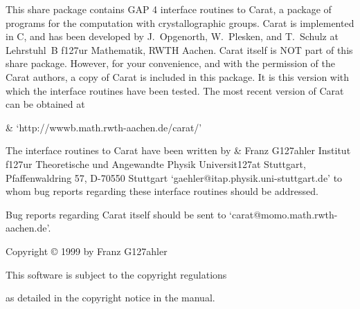
This share package contains GAP 4 interface routines to Carat, 
a package of programs for the computation with crystallographic
groups. Carat is implemented in C, and has been developed by
J.~Opgenorth, W.~Plesken, and T.~Schulz at Lehrstuhl~B f\accent127ur 
Mathematik, RWTH Aachen. Carat itself is NOT part of this share 
package. However, for your convenience, and with the permission
of the Carat authors, a copy of Carat is included in this package. 
It is this version with which the interface routines have been
tested. The most recent version of Carat can be obtained at

\beginitems
&
`http://wwwb.math.rwth-aachen.de/carat/'
\enditems
 
The {\GAP} interface routines to Carat have been written by
\beginitems
&
Franz G\accent127ahler \hfill\break
Institut f\accent127ur Theoretische und Angewandte Physik \hfill\break
Universit\accent127at Stuttgart, Pfaffenwaldring 57, 
D-70550 Stuttgart\hfill\break
`gaehler@itap.physik.uni-stuttgart.de'
\enditems
to whom bug reports regarding these interface routines should be
addressed. 

Bug reports regarding Carat itself should be sent to
`carat@momo.math.rwth-aachen.de'.

\vfill
\centerline{Copyright {\copyright} 1999 by Franz G\accent127ahler}\bigskip
\smallskip
\centerline{This software is subject to the {\GAP} copyright regulations}
\centerline{as detailed in the copyright notice in the {\GAP} manual.}



